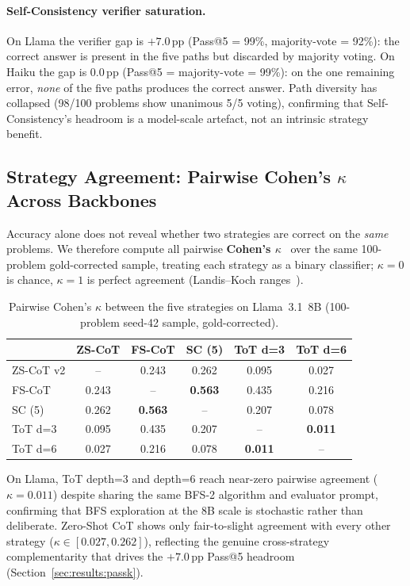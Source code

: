 ﻿\documentclass[runningheads]{llncs}
\begin{document}
\paragraph{Self-Consistency verifier saturation.}
On Llama the verifier gap is $+7.0$\,pp (Pass@5 = 99\%,
majority-vote = 92\%): the correct answer is present in the five
paths but discarded by majority voting.
On Haiku the gap is $0.0$\,pp (Pass@5 = majority-vote = 99\%): on
the one remaining error, \emph{none} of the five paths produces the
correct answer.
Path diversity has collapsed (98/100 problems show unanimous 5/5
voting), confirming that Self-Consistency's headroom is a model-scale
artefact, not an intrinsic strategy benefit.

\subsection{Strategy Agreement: Pairwise Cohen's $\kappa$ Across Backbones}
\label{sec:results:kappa}

Accuracy alone does not reveal whether two strategies are correct on
the \emph{same} problems.
We therefore compute all pairwise \textbf{Cohen's $\kappa$}~\cite{cohen1960kappa}
over the same 100-problem gold-corrected sample, treating each strategy
as a binary classifier; $\kappa=0$ is chance, $\kappa=1$ is perfect
agreement (Landis--Koch ranges~\cite{landis1977kappa}).

\begin{table}[H]
\centering
\caption{Pairwise Cohen's $\kappa$ between the five strategies on
Llama~3.1~8B (100-problem seed-42 sample, gold-corrected).}
\label{tab:kappa:llama}
\begin{tabular}{@{}lccccc@{}}
\toprule
& \textbf{ZS-CoT} & \textbf{FS-CoT} & \textbf{SC (5)} &
\textbf{ToT d=3} & \textbf{ToT d=6} \\
\midrule
ZS-CoT v2  & --     & 0.243 & 0.262 & 0.095 & 0.027 \\
FS-CoT     & 0.243  & --    & \textbf{0.563} & 0.435 & 0.216 \\
SC (5)     & 0.262  & \textbf{0.563} & --    & 0.207 & 0.078 \\
ToT d=3    & 0.095  & 0.435 & 0.207 & --    & \textbf{0.011} \\
ToT d=6    & 0.027  & 0.216 & 0.078 & \textbf{0.011} & --    \\
\bottomrule
\end{tabular}
\end{table}

On Llama, ToT depth=3 and depth=6 reach near-zero pairwise agreement
($\kappa=0.011$) despite sharing the same BFS-2 algorithm and evaluator
prompt, confirming that BFS exploration at the 8B scale is stochastic
rather than deliberate.
Zero-Shot CoT shows only fair-to-slight agreement with every other
strategy ($\kappa \in [0.027, 0.262]$), reflecting the genuine
cross-strategy complementarity that drives the $+7.0$\,pp Pass@5
headroom (Section~\ref{sec:results:passk}).
\end{document}

